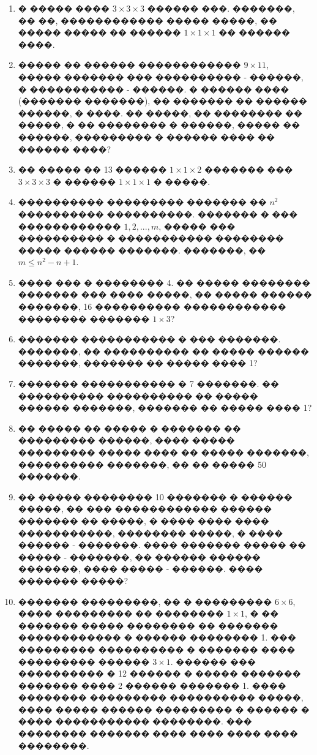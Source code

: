 \documentclass[a4paper,12pt]{article}
\begin{document}
\begin{enumerate}
\item � ����� ���� $3\times 3\times 3$ ������ ���. �������, �� ��, ������������ ����� �����, �� ����� ����� �� ������ $1\times 1\times 1$ �� ������ ����.

\item ����� �� ������ ������������ $9\times 11$, ����� ������� ��� ���������� - ������, � ����������� - ������. � ������ ���� (������� �������), �� ������� �� ������ ������, � ����. �� �����, �� �������� �� �����, � �� �������� � ������, ����� �� ������, ��������� � ������ ���� �� ������ ����?

\item �� ����� �� 13 ������ $1\times 1\times 2$ ������� ��� $3\times 3\times 3$ � ������ $1\times 1\times 1$ � �����.

\item ���������� ��������� ������� �� $n^{2}$ ���������� ����������. ������� � ��� ������������ $1,2,...,m$, ����� ��� ���������� � ����������� �������� ����� ������ �������. �������, �� $m\leq n^{2}-n+1$.


\item ���� ��� � �������� 4. �� ����� �������� ������� ��� ���� �����, �� ����� ������ �������, 16 ���������� ������������ �������� ������� $1\times 3$?

\item ������� ����������� � ��� �������. �������, �� ���������� �� ����� ������ �������, ������� �� ����� ���� 1?

\item ������� ����������� � 7 �������. �� ���������� ���������� �� ����� ������ �������, ������� �� ����� ���� 1?

\item �� ����� �� ����� � ������� �� ��������� ������, ���� ����� ��������� ����� ���� �� ����� �������, ���������� �������, �� �� ����� 50 �������.

\item �� ����� �������� 10 ������� � ������ �����, �� ��� ������������ ������ ������� �� �����, � ���� ���� ���� �����������, �������� �����, � ���� ������ - �������. ���� ������� ����� �� ����� - �������, �� ������ ������ �������, ���� ����� - ������. ���� ������� �����?

\item ������� ���������, �� � ��������� $6\times 6$, ���� ��������� �� �������� $1\times 1$, � �� ������� ����� �������� �� ������� ������������ � ������ �������� 1. ��� ��������� ���������� � ������� ���� ��������� ������ $3\times 1$. ������ ��� ���������� � 12 ������ � ����� ������� ������� ���� 2 ������ ������� 1. ���� �������� ��������� ���������� �����, ���� ����� ������ ��������� � ������ � ���� ����������� ��������. ��� �������� ������� ���� ���� ���� ���� ��������.


\end{enumerate}
\end{document}
